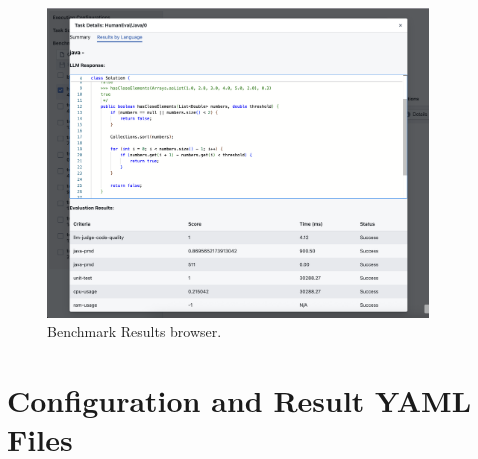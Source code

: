 \begin{figure}[H]
    \includegraphics[width=0.9\textwidth]{./images/ui_result_single_task}
    \caption{Benchmark Results browser. }
    \label{appendix:ui_result_single_task}
\end{figure}

\section{Configuration and Result YAML Files}
\label{appendix:config_files}

